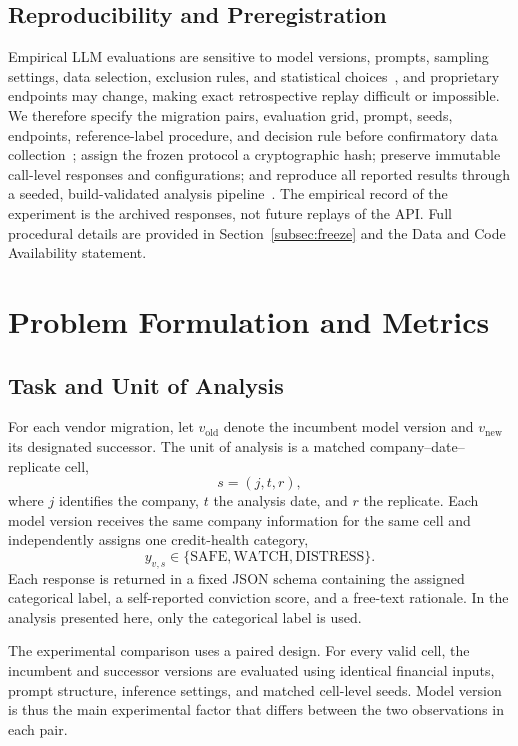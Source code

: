 \documentclass{ieeeaccess}
\begin{document}
\subsection{Reproducibility and Preregistration}
Empirical LLM evaluations are sensitive to model versions, prompts, sampling settings, data selection, exclusion rules, and statistical choices~\cite{simmons}, and proprietary endpoints may change, making exact retrospective replay difficult or impossible. We therefore specify the migration pairs, evaluation grid, prompt, seeds, endpoints, reference-label procedure, and decision rule before confirmatory data collection~\cite{nosek}; assign the frozen protocol a cryptographic hash; preserve immutable call-level responses and configurations; and reproduce all reported results through a seeded, build-validated analysis pipeline~\cite{pineau}. The empirical record of the experiment is the archived responses, not future replays of the API. Full procedural details are provided in Section~\ref{subsec:freeze} and the Data and Code Availability statement.

\section{Problem Formulation and Metrics}
\subsection{Task and Unit of Analysis}
For each vendor migration, let $v_{\mathrm{old}}$ denote the incumbent model version and $v_{\mathrm{new}}$ its designated successor. The unit of analysis is a matched company--date--replicate cell,
\begin{equation}
s=(j,t,r),
\end{equation}
where $j$ identifies the company, $t$ the analysis date, and $r$ the replicate. Each model version receives the same company information for the same cell and independently assigns one credit-health category,
\begin{equation}
y_{v,s}\in\{\text{SAFE},\text{WATCH},\text{DISTRESS}\}.
\end{equation}
Each response is returned in a fixed JSON schema containing the assigned categorical label, a self-reported conviction score, and a free-text rationale. In the analysis presented here, only the categorical label is used.

The experimental comparison uses a paired design. For every valid cell, the incumbent and successor versions are evaluated using identical financial inputs, prompt structure, inference settings, and matched cell-level seeds. Model version is thus the main experimental factor that differs between the two observations in each pair.
\end{document}
